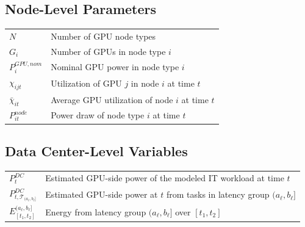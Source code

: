 \documentclass[preprint,12pt]{elsarticle}
\providecommand{\DIFaddbegin}{} %
\providecommand{\DIFaddend}{} %
\providecommand{\DIFdelbegin}{} %
\providecommand{\DIFdelend}{} %
\providecommand{\DIFscaledelfig}{0.5}
\newlength{\DIFdelgraphicswidth} %
\newlength{\DIFdelgraphicsheight} %
\providecommand{\DIFaddincludegraphics}[2][]{{\color{blue}\fbox{\DIFOincludegraphics[#1]{#2}}}} %
\providecommand{\DIFdelincludegraphics}[2][]{%
\sbox{\DIFdelgraphicsbox}{\DIFOincludegraphics[#1]{#2}}%
\settoboxwidth{\DIFdelgraphicswidth}{\DIFdelgraphicsbox} %
\settoboxtotalheight{\DIFdelgraphicsheight}{\DIFdelgraphicsbox} %
\scalebox{\DIFscaledelfig}{%
\parbox[b]{\DIFdelgraphicswidth}{\usebox{\DIFdelgraphicsbox}\\[-\baselineskip] \rule{\DIFdelgraphicswidth}{0em}}\llap{\resizebox{\DIFdelgraphicswidth}{\DIFdelgraphicsheight}{%
\setlength{\unitlength}{\DIFdelgraphicswidth}%
\begin{picture}(1,1)%
\thicklines\linethickness{2pt} %
{\color[rgb]{1,0,0}\put(0,0){\framebox(1,1){}}}%
{\color[rgb]{1,0,0}\put(0,0){\line( 1,1){1}}}%
{\color[rgb]{1,0,0}\put(0,1){\line(1,-1){1}}}%
\end{picture}%
}\hspace*{3pt}}} %
} %
\DeclareRobustCommand{\DIFaddbegin}{\DIFOaddbegin \let\includegraphics\DIFaddincludegraphics} %
\DeclareRobustCommand{\DIFaddend}{\DIFOaddend \let\includegraphics\DIFOincludegraphics} %
\DeclareRobustCommand{\DIFdelbegin}{\DIFOdelbegin \let\includegraphics\DIFdelincludegraphics} %
\DeclareRobustCommand{\DIFdelend}{\DIFOaddend \let\includegraphics\DIFOincludegraphics} %
\begin{document}
\subsection*{Node-Level Parameters}
\begin{tabular}{ll}
$N$ & Number of GPU node types \\
$G_i$ & Number of GPUs in node type $i$ \\
$P^{GPU,nom}_i$ & Nominal GPU power in node type $i$ \\
$\chi_{ijt}$ & Utilization of GPU $j$ in node $i$ at time $t$ \\
$\bar{\chi}_{it}$ & Average GPU utilization of node $i$ at time $t$ \\
$P^{node}_{it}$ & Power draw of node type $i$ at time $t$ \\
\end{tabular}

\vspace{1em}

\subsection*{Data Center-Level Variables}
\DIFdelbegin %
\DIFdelend \DIFaddbegin \begin{tabular}{ll}
$P^{DC}_t$ & Estimated GPU-side power of the modeled IT workload at time $t$ \\
$P^{DC}_{t, \mathcal{T}_{(a_\ell, b_\ell]}}$ & Estimated GPU-side power at $t$ from tasks in latency group $(a_\ell, b_\ell]$ \\
$E^{(a_\ell, b_\ell]}_{[t_1, t_2]}$ & Energy from latency group $(a_\ell, b_\ell]$ over $[t_1, t_2]$ \\
\end{tabular}

\DIFaddend 

\vspace{1em}
\end{document}
